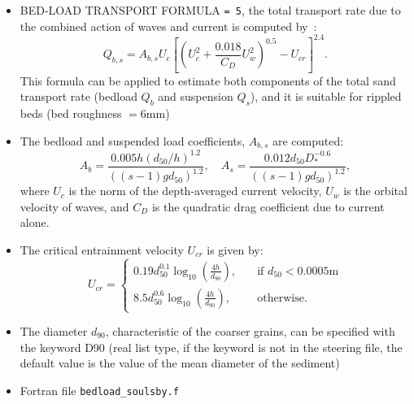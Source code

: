 \begin{itemize}
\item {\ttfamily BED-LOAD TRANSPORT FORMULA} \texttt{= 5}, the total transport rate due to the combined action of waves and current is computed by~\cite{Soulsby97}:
\begin{equation*}
Q_{b,s} = A_{b,s} U_c\left[ \left( U_c^2+\frac{0.018}{C_D} U_w^2\right)^{0.5}-U_{cr}\right]^{2.4}.
\end{equation*}
This formula can be applied to estimate both components of the total sand
transport rate (bedload $Q_b$ and suspension $Q_s$), and it is suitable for rippled beds (bed roughness $=6$mm)

\item The bedload and suspended load coefficients, $A_{b,s}$ are computed:
\begin{equation*}
A_b = \frac{0.005 h \left(d_{50}/h\right)^{1.2}}{\left((s-1)gd_{50}\right)^{1.2}}, \quad A_s = \frac{0.012 d_{50}D_*^{-0.6}}{\left((s-1)gd_{50}\right)^{1.2}},
\end{equation*}
where $U_c$ is the norm of the depth-averaged current velocity, $U_w$ is the orbital velocity of waves, and $C_D$ is the quadratic drag coefficient due to current alone.
\item The critical entrainment velocity $U_{cr}$ is given by:
\begin{equation*}
U_{cr} = \left\{\begin{array}{ll}
\displaystyle
0.19 d_{50}^{0.1}\log_{10}\left(\frac{4h}{d_{90}}\right), & \quad \text{if } d_{50} < 0.0005 \text{m} \\
\displaystyle
8.5 d_{50}^{0.6} \log_{10}\left(\frac{4h}{d_{90}} \right), & \quad \text{otherwise}.
\end{array}
\right.
\end{equation*}
\item The diameter $d_{90}$, characteristic of the coarser grains, can be specified with the keyword {\ttfamily D90} (real list type, if the keyword is not in the steering file, the default value
is the value of the mean diameter of the sediment) %
\item Fortran file \texttt{bedload\_soulsby.f}
\end{itemize}


